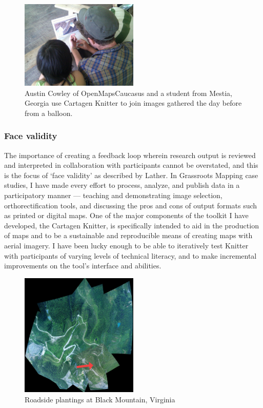 \documentclass[11pt]{report}
\begin{document}
\begin{figure}
  \begin{flushleft}
	\includegraphics[width=0.5\textwidth]{images/knitter-mestia.jpg} 
	\caption{Austin Cowley of OpenMapsCaucasus and a student from Mestia, Georgia use Cartagen Knitter to join images gathered the day before from a balloon.}
  \end{flushleft}
\end{figure}

\subsubsection{Face validity}

The importance of creating a feedback loop wherein research output is reviewed and interpreted in collaboration with participants cannot be overstated, and this is the focus of `face validity' as described by Lather. In Grassroots Mapping case studies, I have made every effort to process, analyze, and publish data in a participatory manner --- teaching and demonstrating image selection, orthorectification tools, and discussing the pros and cons of output formats such as printed or digital maps. One of the major components of the toolkit I have developed, the Cartagen Knitter, is specifically intended to aid in the production of maps and to be a sustainable and reproducible means of creating maps with aerial imagery. I have been lucky enough to be able to iteratively test Knitter with participants of varying levels of technical literacy, and to make incremental improvements on the tool's interface and abilities.  

\begin{figure}
  \begin{flushright}
	\includegraphics[width=0.5\textwidth]{images/black-mountain.jpg}
	\caption{Roadside plantings at Black Mountain, Virginia}
  \end{flushright}
\end{figure}
\end{document}
